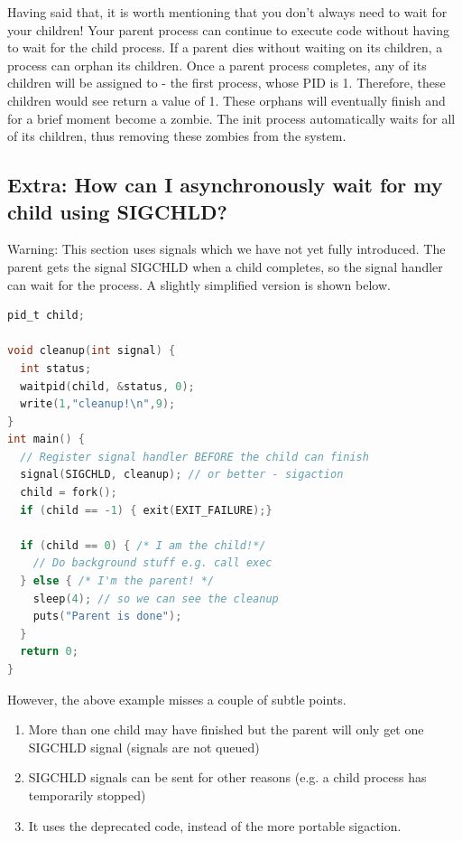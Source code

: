 Having said that, it is worth mentioning that you don't always need to wait for your children!
Your parent process can continue to execute code without having to wait for the child process.
If a parent dies without waiting on its children, a process can orphan its children.
Once a parent process completes, any of its children will be assigned to  - the first process, whose PID is 1.
Therefore, these children would see  return a value of 1.
These orphans will eventually finish and for a brief moment become a zombie.
The init process automatically waits for all of its children, thus removing these zombies from the system.

\subsection{Extra: How can I asynchronously wait for my child using SIGCHLD?}

Warning: This section uses signals which we have not yet fully introduced.
The parent gets the signal SIGCHLD when a child completes, so the signal handler can wait for the process.
A slightly simplified version is shown below.

\begin{lstlisting}[language=C]
pid_t child;

void cleanup(int signal) {
  int status;
  waitpid(child, &status, 0);
  write(1,"cleanup!\n",9);
}
int main() {
  // Register signal handler BEFORE the child can finish
  signal(SIGCHLD, cleanup); // or better - sigaction
  child = fork();
  if (child == -1) { exit(EXIT_FAILURE);}

  if (child == 0) { /* I am the child!*/
    // Do background stuff e.g. call exec
  } else { /* I'm the parent! */
    sleep(4); // so we can see the cleanup
    puts("Parent is done");
  }
  return 0;
}
\end{lstlisting}

However, the above example misses a couple of subtle points.
\begin{enumerate}
    \item More than one child may have finished but the parent will only get one SIGCHLD signal (signals are not queued)
    \item SIGCHLD signals can be sent for other reasons (e.g. a child process has temporarily stopped)
    \item It uses the deprecated  code, instead of the more portable sigaction.
\end{enumerate}


